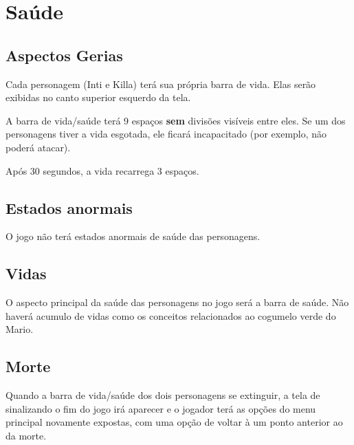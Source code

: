 \documentclass[12pt]{article}
\begin{document}
\section{Saúde}

\subsection{Aspectos Gerias}
Cada personagem (Inti e Killa) terá sua própria barra de vida. Elas serão
exibidas no canto superior esquerdo da tela.


A barra de vida/saúde terá 9 espaços {\bf sem} divisões visíveis entre eles.
Se um dos personagens tiver a vida esgotada, ele ficará incapacitado (por exemplo,
não poderá atacar).


Após 30 segundos, a vida recarrega 3 espaços.

\subsection{Estados anormais}
O jogo não terá estados anormais de saúde das personagens.

\subsection{Vidas}
O aspecto principal da saúde das personagens no jogo será a barra de saúde.
Não haverá acumulo de vidas como os conceitos relacionados ao cogumelo verde
do Mario.

\subsection{Morte}
Quando a barra de vida/saúde dos dois personagens se extinguir, a tela de
sinalizando o fim do jogo irá aparecer e o jogador terá as opções do menu
principal novamente expostas, com uma opção de voltar à um ponto anterior
ao da morte.
\end{document}
